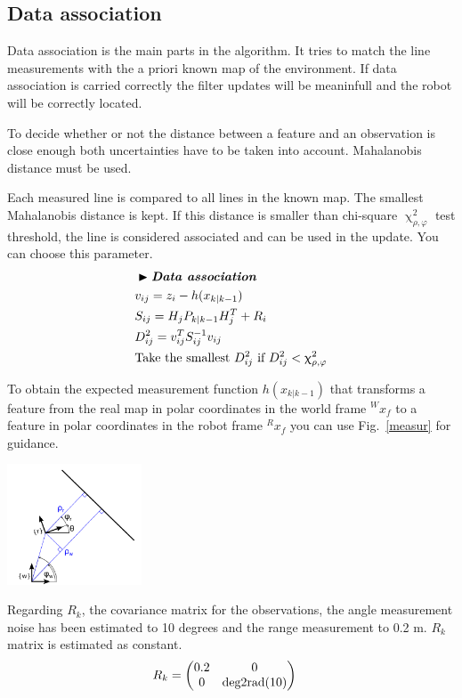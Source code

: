 \documentclass[a4paper,10pt]{article}
\begin{document}
\subsection{Data association}

Data association is the main parts in the algorithm. It tries to match the line measurements with the a priori known map of the environment. If data association is carried correctly the filter updates will be meaninfull and the robot will be correctly located.

To decide whether or not the distance between a feature and an observation is close enough both uncertainties have to be taken into account. Mahalanobis distance must be used.

Each measured line is compared to all lines in the known map. The smallest Mahalanobis distance is kept. If this distance is smaller than chi-square $\upchi_{\rho,\varphi}^2$ test threshold, the line is considered associated and can be used in the update. You can choose this parameter.
\begin{align*}
    & \blacktriangleright \textit{\textbf{Data association}}\\
    & v_{ij} = z_i - h(x_{k|k-1}) \\
    & S_{ij} = H_j P_{k|k-1} H_j^T + R_i \\
    & D_{ij}^2 = v_{ij}^T S_{ij}^{-1} v_{ij} \\
    & \text{Take the smallest } D_{ij}^2 \text{ if } D_{ij}^2 < \upchi_{\rho,\varphi}^2
\end{align*}

To obtain the expected measurement function $h(x_{k|k-1})$ that transforms a feature from the real map in polar coordinates in the world frame ${}^Wx_f$ to a feature in polar coordinates in the robot frame ${}^Rx_f$ you can use  Fig.~\ref{measur} for guidance.
\begin{center}
	\includegraphics[width=0.30\textwidth]{pict/find_h.png}
	\label{measur}
\end{center}

Regarding $R_k$, the covariance matrix for the observations, the angle measurement noise has been estimated to 10 degrees and the range measurement to 0.2 m. $R_k$ matrix is estimated as constant.
\begin{align}
    \label{R_k}
    R_k &= \begin{pmatrix}
        0.2 & 0 \\
        0 & \textnormal{deg2rad}(10)
    \end{pmatrix}
\end{align}
\end{document}

